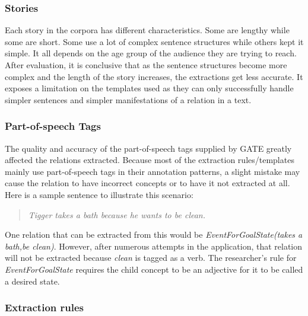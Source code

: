 \subsubsection{Stories}
\label{sec:stories}

Each story in the corpora has different characteristics. Some are lengthy while some are short. Some use a lot of complex sentence structures while others kept it simple. It all depends on the age group of the audience they are trying to reach. After evaluation, it is conclusive that as the sentence structures become more complex and the length of the story increases, the extractions get less accurate. It exposes a limitation on the templates used as they can only successfully handle simpler sentences and simpler manifestations of a relation in a text.

\subsubsection{Part-of-speech Tags}
\label{sec:pos}

The quality and accuracy of the part-of-speech tags supplied by GATE greatly affected the relations extracted. Because most of the extraction rules/templates mainly use part-of-speech tags in their annotation patterns, a slight mistake may cause the relation to have incorrect concepts or to have it not extracted at all. Here is a sample sentence to illustrate this scenario:

\begin{verse}
\itshape
Tigger takes a bath because he wants to be clean.
\end{verse}

One relation that can be extracted from this would be \textit{EventForGoalState(takes a bath,be clean)}. However, after numerous attempts in the application, that relation will not be extracted because \textit{clean} is tagged as a verb. The researcher's rule for \textit{EventForGoalState} requires the child concept to be an adjective for it to be called a desired state.

\subsubsection{Extraction rules}
\label{sec:templates}


